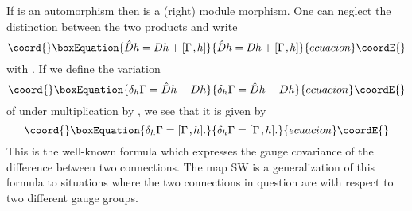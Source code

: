 \documentclass[a4paper,12pt]{article}
\def\h#1{\hat #1}
\def\k{\kern-.1em\mathbin{,}\kern-.1em}
\begin{document}
If \myHighlight{$\rho$}\coordHE{} is an automorphism then \myHighlight{$\h{D} - D$}\coordHE{} is a (right) module
morphism. One can neglect the distinction between the two products and
write
\begin{equation}\coord{}\boxEquation{
\h{D} h = D h + [\Gamma\k h]                           \label{Gamma0}
}{
\h{D} h = D h + [\Gamma\k h]                           }{ecuacion}\coordE{}\end{equation}
with \myHighlight{$\Gamma = \h{A} - A$}\coordHE{}. 
If we define the variation 
\begin{equation}\coord{}\boxEquation{
\delta_h \Gamma = \h{D} h - D h
}{
\delta_h \Gamma = \h{D} h - D h
}{ecuacion}\coordE{}\end{equation}
of \myHighlight{$\Gamma$}\coordHE{} under multiplication by \coordHE{}, we see that it 
is given by
\begin{equation}\coord{}\boxEquation{
\delta_h \Gamma = [\Gamma\k h].                         \label{Gamma}
}{
\delta_h \Gamma = [\Gamma\k h].                         }{ecuacion}\coordE{}\end{equation}
This is the well-known formula which expresses the gauge covariance of
the difference between two connections. The map SW is a generalization
of this formula to situations where the two connections in question
are with respect to two different gauge groups.
\end{document}
